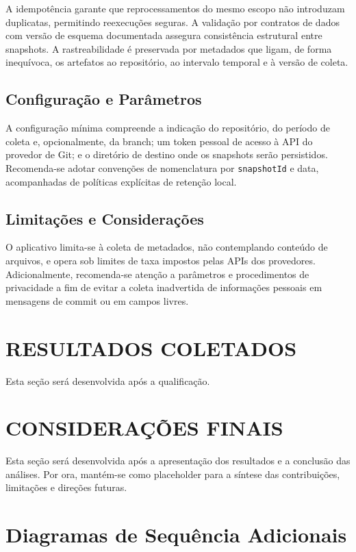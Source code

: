 \documentclass[12pt,a4paper]{article}
\begin{document}
A idempotência garante que reprocessamentos do mesmo escopo não introduzam duplicatas, permitindo reexecuções seguras. A validação por contratos de dados com versão de esquema documentada assegura consistência estrutural entre snapshots. A rastreabilidade é preservada por metadados que ligam, de forma inequívoca, os artefatos ao repositório, ao intervalo temporal e à versão de coleta.

\subsection{Configuração e Parâmetros}

A configuração mínima compreende a indicação do repositório, do período de coleta e, opcionalmente, da branch; um token pessoal de acesso à API do provedor de Git; e o diretório de destino onde os snapshots serão persistidos. Recomenda-se adotar convenções de nomenclatura por \texttt{snapshotId} e data, acompanhadas de políticas explícitas de retenção local.

\subsection{Limitações e Considerações}

O aplicativo limita-se à coleta de metadados, não contemplando conteúdo de arquivos, e opera sob limites de taxa impostos pelas APIs dos provedores. Adicionalmente, recomenda-se atenção a parâmetros e procedimentos de privacidade a fim de evitar a coleta inadvertida de informações pessoais em mensagens de commit ou em campos livres.
\section{RESULTADOS COLETADOS}

Esta seção será desenvolvida após a qualificação.

\section{CONSIDERAÇÕES FINAIS}

Esta seção será desenvolvida após a apresentação dos resultados e a conclusão das análises. Por ora, mantém-se como placeholder para a síntese das contribuições, limitações e direções futuras.


\newpage


\appendix
\section{Diagramas de Sequência Adicionais}
\end{document}
